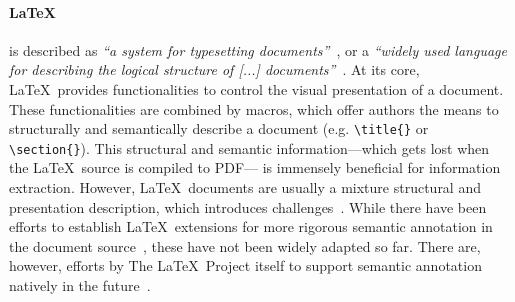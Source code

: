 \paragraph{\LaTeX}
is described as \textit{``a system for typesetting documents''}~\cite{Lamport1994}, or a \textit{``widely used language for describing the logical structure of [...] documents''}~\cite{Mittelbach2023}. At its core, \LaTeX\ provides functionalities to control the visual presentation of a document. These functionalities are combined by macros, which offer authors the means to structurally and semantically describe a document (e.g. \texttt{\textbackslash title\{\}} or \texttt{\textbackslash section\{\}}). This structural and semantic information---which gets lost when the \LaTeX\ source is compiled to PDF---
is immensely beneficial for information extraction.
However, \LaTeX\ documents are usually a mixture structural and presentation description, which introduces challenges~\cite{Stamerjohanns2008}.
While there have been efforts to establish \LaTeX\ extensions for more rigorous semantic annotation in the document source~\cite{Krieg2004,Groza2007,Bless2023}, these have not been widely adapted so far.
There are, however, efforts by The \LaTeX\ Project itself to support semantic annotation natively in the future~\cite{Mittelbach2020,Mittelbach2023}.

